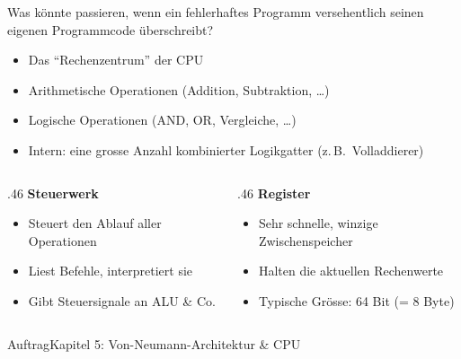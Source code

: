 \begin{frame}
\begin{center}
Was könnte passieren, wenn ein fehlerhaftes Programm versehentlich seinen eigenen Programmcode überschreibt?
\end{center}
\end{frame}

{
\begin{frame}
\end{frame}}

\begin{frame}
\begin{itemize}\setlength\itemsep{7pt}
  \item Das \enquote{Rechenzentrum} der CPU
  \item Arithmetische Operationen (Addition, Subtraktion, \ldots)
  \item Logische Operationen (AND, OR, Vergleiche, \ldots)
  \item Intern: eine grosse Anzahl kombinierter Logikgatter (z.\,B.\ Volladdierer)
\end{itemize}
\end{frame}

\begin{frame}
\begin{columns}[T,onlytextwidth]
\begin{column}{.46\textwidth}
\large\bfseries\color{FDUteal}Steuerwerk
\vspace{2mm}
\normalsize
\begin{itemize}\setlength\itemsep{5pt}
  \item Steuert den Ablauf aller Operationen
  \item Liest Befehle, interpretiert sie
  \item Gibt Steuersignale an ALU \& Co.
\end{itemize}
\end{column}
\begin{column}{.46\textwidth}
\large\bfseries\color{FDUblue}Register
\vspace{2mm}
\normalsize
\begin{itemize}\setlength\itemsep{5pt}
  \item Sehr schnelle, winzige Zwischenspeicher
  \item Halten die aktuellen Rechenwerte
  \item Typische Grösse: 64 Bit (= 8 Byte)
\end{itemize}
\end{column}
\end{columns}
\end{frame}

\begin{frame}{Auftrag}{Kapitel 5: Von-Neumann-Architektur \& CPU}
\end{frame}
